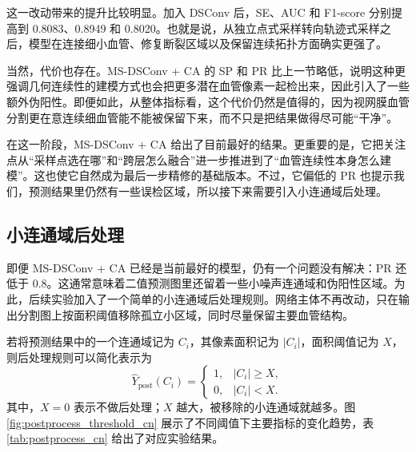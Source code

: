 \documentclass[a4paper,12pt]{article}
\begin{document}
\begin{table}[htbp]
\centering
\caption{MS-Modulated + CA 与 MS-DSConv + CA 实验结果对比}
\label{tab:msdsconv_ca_cn}
\end{table}

这一改动带来的提升比较明显。加入 DSConv 后，SE、AUC 和 F1-score 分别提高到 0.8083、0.8949 和 0.8020。也就是说，从独立点式采样转向轨迹式采样之后，模型在连接细小血管、修复断裂区域以及保留连续拓扑方面确实更强了。

当然，代价也存在。MS-DSConv + CA 的 SP 和 PR 比上一节略低，说明这种更强调几何连续性的建模方式也会把更多潜在血管像素一起检出来，因此引入了一些额外伪阳性。即便如此，从整体指标看，这个代价仍然是值得的，因为视网膜血管分割更在意连续细血管能不能被保留下来，而不只是把结果做得尽可能“干净”。

在这一阶段，MS-DSConv + CA 给出了目前最好的结果。更重要的是，它把关注点从“采样点选在哪”和“跨层怎么融合”进一步推进到了“血管连续性本身怎么建模”。这也使它自然成为最后一步精修的基础版本。不过，它偏低的 PR 也提示我们，预测结果里仍然有一些误检区域，所以接下来需要引入小连通域后处理。

\subsection{小连通域后处理}

即便 MS-DSConv + CA 已经是当前最好的模型，仍有一个问题没有解决：PR 还低于 0.8。这通常意味着二值预测图里还留着一些小噪声连通域和伪阳性区域。为此，后续实验加入了一个简单的小连通域后处理规则。网络主体不再改动，只在输出分割图上按面积阈值移除孤立小区域，同时尽量保留主要血管结构。

若将预测结果中的一个连通域记为 \(C_i\)，其像素面积记为 \(|C_i|\)，面积阈值记为 \(X\)，则后处理规则可以简化表示为
\[
\hat{Y}_{\mathrm{post}}(C_i)=
\begin{cases}
1, & |C_i| \ge X,\\
0, & |C_i| < X.
\end{cases}
\]
其中，\(X=0\) 表示不做后处理；\(X\) 越大，被移除的小连通域就越多。图 \ref{fig:postprocess_threshold_cn} 展示了不同阈值下主要指标的变化趋势，表 \ref{tab:postprocess_cn} 给出了对应实验结果。
\end{document}
